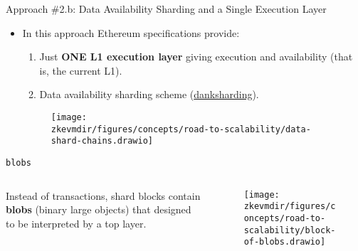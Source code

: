 \begin{frame}{Approach \#2.b: Data Availability Sharding and a Single Execution Layer}
\begin{itemize}
\item In this approach Ethereum specifications provide:
  \begin{enumerate}
  \item Just \textbf{ONE L1 execution layer} giving execution and availability (that is, the current L1).
  \item Data availability sharding scheme (\href{https://ethereum.org/ca/roadmap/danksharding}{danksharding}).
  \end{enumerate}
\begin{figure}
\texttt{[image: \\zkevmdir/figures/concepts/road-to-scalability/data-shard-chains.drawio]}
\end{figure}
\end{itemize}
\end{frame}




\begin{frame}{\texttt{blobs}}
\begin{columns}
\begin{column}{0.4\textwidth}
Instead of transactions, shard blocks contain \textbf{blobs} (binary large objects) that designed to be interpreted by a top layer.
\end{column}
\begin{column}{0.58\textwidth}
\begin{figure}
\texttt{[image: \\zkevmdir/figures/concepts/road-to-scalability/block-of-blobs.drawio]}
\end{figure}
\end{column}
\end{columns}
\end{frame}




